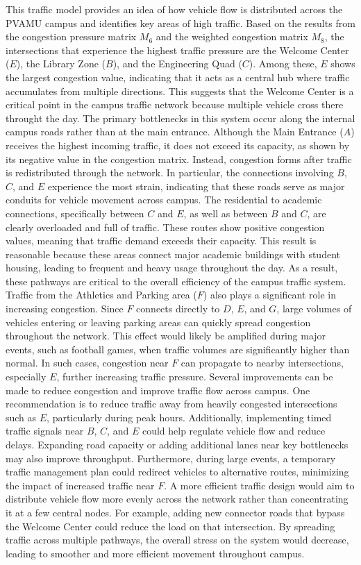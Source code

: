 \documentclass{ximera}
\begin{document}
This traffic model provides an idea of how vehicle flow is distributed across the PVAMU campus and identifies key areas of high traffic. Based on the results from the congestion pressure matrix \(M_6\) and the weighted congestion matrix \(M_8\), the intersections that experience the highest traffic pressure are the Welcome Center (\(E\)), the Library Zone (\(B\)), and the Engineering Quad (\(C\)). Among these, \(E\) shows the largest congestion value, indicating that it acts as a central hub where traffic accumulates from multiple directions. This suggests that the Welcome Center is a critical point in the campus traffic network because multiple vehicle cross there throught the day. The primary bottlenecks in this system occur along the internal campus roads rather than at the main entrance. Although the Main Entrance (\(A\)) receives the highest incoming traffic, it does not exceed its capacity, as shown by its negative value in the congestion matrix. Instead, congestion forms after traffic is redistributed through the network. In particular, the connections involving \(B\), \(C\), and \(E\) experience the most strain, indicating that these roads serve as major conduits for vehicle movement across campus. The residential to academic connections, specifically between \(C\) and \(E\), as well as between \(B\) and \(C\), are clearly overloaded and full of traffic. These routes show positive congestion values, meaning that traffic demand exceeds their capacity. This result is reasonable because these areas connect major academic buildings with student housing, leading to frequent and heavy usage throughout the day. As a result, these pathways are critical to the overall efficiency of the campus traffic system. Traffic from the Athletics and Parking area (\(F\)) also plays a significant role in increasing congestion. Since \(F\) connects directly to \(D\), \(E\), and \(G\), large volumes of vehicles entering or leaving parking areas can quickly spread congestion throughout the network. This effect would likely be amplified during major events, such as football games, when traffic volumes are significantly higher than normal. In such cases, congestion near \(F\) can propagate to nearby intersections, especially \(E\), further increasing traffic pressure. Several improvements can be made to reduce congestion and improve traffic flow across campus. One recommendation is to reduce traffic away from heavily congested intersections such as \(E\), particularly during peak hours. Additionally, implementing timed traffic signals near \(B\), \(C\), and \(E\) could help regulate vehicle flow and reduce delays. Expanding road capacity or adding additional lanes near key bottlenecks may also improve throughput. Furthermore, during large events, a temporary traffic management plan could redirect vehicles to alternative routes, minimizing the impact of increased traffic near \(F\). A more efficient traffic design would aim to distribute vehicle flow more evenly across the network rather than concentrating it at a few central nodes. For example, adding new connector roads that bypass the Welcome Center could reduce the load on that intersection. By spreading traffic across multiple pathways, the overall stress on the system would decrease, leading to smoother and more efficient movement throughout campus.
\end{document}
